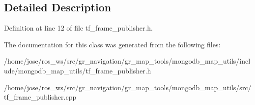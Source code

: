 \subsection{Detailed Description}


Definition at line 12 of file tf\+\_\+frame\+\_\+publisher.\+h.



The documentation for this class was generated from the following files\+:\begin{DoxyCompactItemize}
\item 
/home/jose/ros\+\_\+ws/src/gr\+\_\+navigation/gr\+\_\+map\+\_\+tools/mongodb\+\_\+map\+\_\+utils/include/mongodb\+\_\+map\+\_\+utils/tf\+\_\+frame\+\_\+publisher.\+h\item 
/home/jose/ros\+\_\+ws/src/gr\+\_\+navigation/gr\+\_\+map\+\_\+tools/mongodb\+\_\+map\+\_\+utils/src/tf\+\_\+frame\+\_\+publisher.\+cpp\end{DoxyCompactItemize}
